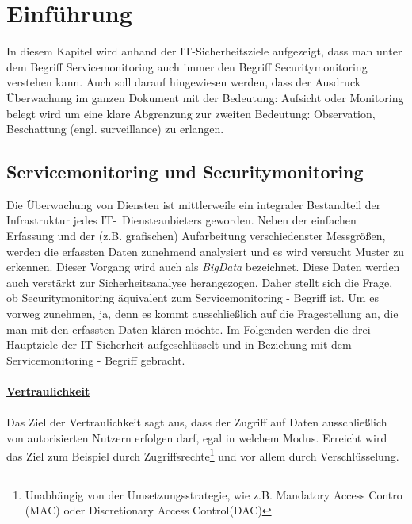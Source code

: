 \chapter{Einführung}\label{01_einf}
\thispagestyle{fancy}

In diesem Kapitel wird anhand der IT-Sicherheitsziele aufgezeigt, dass man unter dem 
Begriff Servicemonitoring auch immer den Begriff Securitymonitoring verstehen
kann. Auch soll darauf hingewiesen werden, dass der Ausdruck Überwachung im ganzen
Dokument mit der Bedeutung: Aufsicht oder Monitoring belegt wird um eine klare Abgrenzung
zur zweiten Bedeutung: Observation, Beschattung (engl. surveillance) zu erlangen.


\section{Servicemonitoring und Securitymonitoring}

Die Überwachung von Diensten ist mittlerweile ein integraler Bestandteil der 
Infrastruktur jedes IT-~Diensteanbieters geworden. Neben der einfachen Erfassung
und der (z.B. grafischen) Aufarbeitung verschiedenster Messgrößen, werden die erfassten 
Daten zunehmend analysiert und es wird versucht Muster zu erkennen. Dieser Vorgang wird 
auch als \textit{BigData} bezeichnet. Diese Daten werden auch verstärkt zur 
Sicherheitsanalyse herangezogen. Daher stellt sich die Frage, ob Securitymonitoring 
äquivalent zum Servicemonitoring - Begriff ist. Um es vorweg zunehmen, ja, denn es kommt 
ausschließlich auf die Fragestellung an, die man mit den erfassten Daten klären möchte. 
Im Folgenden werden die drei Hauptziele der IT-Sicherheit aufgeschlüsselt und in 
Beziehung mit dem Servicemonitoring - Begriff gebracht.\\\\

\underline{\textbf{Vertraulichkeit}}\\\\
Das Ziel der Vertraulichkeit sagt aus, dass der Zugriff auf Daten ausschließlich von
autorisierten Nutzern erfolgen darf, egal in welchem Modus. Erreicht wird das Ziel zum
Beispiel durch Zugriffsrechte\footnote{Unabhängig von der Umsetzungsstrategie, wie z.B. 
Mandatory Access Contro (MAC) oder Discretionary Access Control(DAC)} und vor allem 
durch Verschlüsselung.\\

